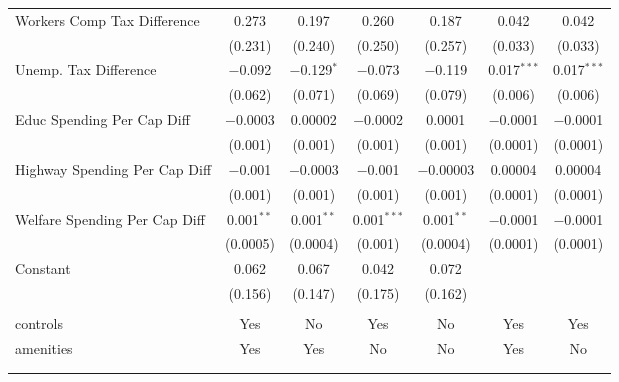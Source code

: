 \begin{table}[!htbp]
\begin{tabular}{@{\extracolsep{5pt}}lcccccc}
  Workers Comp Tax Difference & 0.273 & 0.197 & 0.260 & 0.187 & 0.042 & 0.042 \\ 
  & (0.231) & (0.240) & (0.250) & (0.257) & (0.033) & (0.033) \\ 
  Unemp. Tax Difference & $-$0.092 & $-$0.129$^{*}$ & $-$0.073 & $-$0.119 & 0.017$^{***}$ & 0.017$^{***}$ \\ 
  & (0.062) & (0.071) & (0.069) & (0.079) & (0.006) & (0.006) \\ 
  Educ Spending Per Cap Diff & $-$0.0003 & 0.00002 & $-$0.0002 & 0.0001 & $-$0.0001 & $-$0.0001 \\ 
  & (0.001) & (0.001) & (0.001) & (0.001) & (0.0001) & (0.0001) \\ 
  Highway Spending Per Cap Diff & $-$0.001 & $-$0.0003 & $-$0.001 & $-$0.00003 & 0.00004 & 0.00004 \\ 
  & (0.001) & (0.001) & (0.001) & (0.001) & (0.0001) & (0.0001) \\ 
  Welfare Spending Per Cap Diff & 0.001$^{**}$ & 0.001$^{**}$ & 0.001$^{***}$ & 0.001$^{**}$ & $-$0.0001 & $-$0.0001 \\ 
  & (0.0005) & (0.0004) & (0.001) & (0.0004) & (0.0001) & (0.0001) \\ 
  Constant & 0.062 & 0.067 & 0.042 & 0.072 &  &  \\ 
  & (0.156) & (0.147) & (0.175) & (0.162) &  &  \\ 
 \hline \\[-1.8ex] 
controls & Yes & No & Yes & No & Yes & Yes \\ 
amenities & Yes & Yes & No & No & Yes & No \\ 
\hline \\[-1.8ex] 
\hline 
\hline \\[-1.8ex] 
\end{tabular} 
\end{table} 
